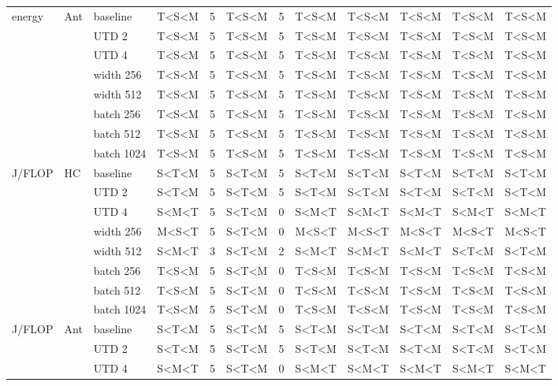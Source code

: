 {\begin{longtable}{@{}lllllllccccc@{}}
    \midrule
    energy & Ant & baseline & T<S<M & \num{5} & T<S<M & \num{5} & T<S<M & T<S<M & T<S<M & T<S<M & T<S<M \\
     &  & UTD 2 & T<S<M & \num{5} & T<S<M & \num{5} & T<S<M & T<S<M & T<S<M & T<S<M & T<S<M \\
     &  & UTD 4 & T<S<M & \num{5} & T<S<M & \num{5} & T<S<M & T<S<M & T<S<M & T<S<M & T<S<M \\
     &  & width 256 & T<S<M & \num{5} & T<S<M & \num{5} & T<S<M & T<S<M & T<S<M & T<S<M & T<S<M \\
     &  & width 512 & T<S<M & \num{5} & T<S<M & \num{5} & T<S<M & T<S<M & T<S<M & T<S<M & T<S<M \\
     &  & batch 256 & T<S<M & \num{5} & T<S<M & \num{5} & T<S<M & T<S<M & T<S<M & T<S<M & T<S<M \\
     &  & batch 512 & T<S<M & \num{5} & T<S<M & \num{5} & T<S<M & T<S<M & T<S<M & T<S<M & T<S<M \\
     &  & batch 1024 & T<S<M & \num{5} & T<S<M & \num{5} & T<S<M & T<S<M & T<S<M & T<S<M & T<S<M \\
    \midrule
    J/FLOP & HC & baseline & S<T<M & \num{5} & S<T<M & \num{5} & S<T<M & S<T<M & S<T<M & S<T<M & S<T<M \\
     &  & UTD 2 & S<T<M & \num{5} & S<T<M & \num{5} & S<T<M & S<T<M & S<T<M & S<T<M & S<T<M \\
     &  & UTD 4 & S<M<T & \num{5} & S<T<M & \num{0} & S<M<T & S<M<T & S<M<T & S<M<T & S<M<T \\
     &  & width 256 & M<S<T & \num{5} & S<T<M & \num{0} & M<S<T & M<S<T & M<S<T & M<S<T & M<S<T \\
     &  & width 512 & S<M<T & \num{3} & S<T<M & \num{2} & S<M<T & S<M<T & S<M<T & S<T<M & S<T<M \\
     &  & batch 256 & T<S<M & \num{5} & S<T<M & \num{0} & T<S<M & T<S<M & T<S<M & T<S<M & T<S<M \\
     &  & batch 512 & T<S<M & \num{5} & S<T<M & \num{0} & T<S<M & T<S<M & T<S<M & T<S<M & T<S<M \\
     &  & batch 1024 & T<S<M & \num{5} & S<T<M & \num{0} & T<S<M & T<S<M & T<S<M & T<S<M & T<S<M \\
    \midrule
    J/FLOP & Ant & baseline & S<T<M & \num{5} & S<T<M & \num{5} & S<T<M & S<T<M & S<T<M & S<T<M & S<T<M \\
     &  & UTD 2 & S<T<M & \num{5} & S<T<M & \num{5} & S<T<M & S<T<M & S<T<M & S<T<M & S<T<M \\
     &  & UTD 4 & S<M<T & \num{5} & S<T<M & \num{0} & S<M<T & S<M<T & S<M<T & S<M<T & S<M<T \\

\end{longtable}}

